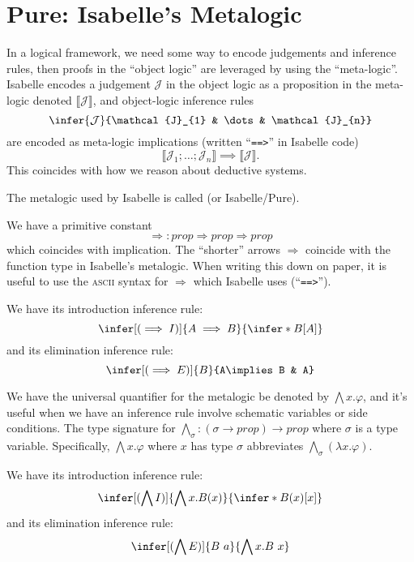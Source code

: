 \section{Pure: Isabelle's Metalogic}
\begin{node}\label{isabelle:metalogic-0000}%
In a logical framework, we need some way to encode judgements and
inference rules, then proofs in the ``object logic'' are leveraged by
using the ``meta-logic''. Isabelle encodes a judgement $\mathcal{J}$ in
the object logic as a proposition in the meta-logic denoted
$\llbracket\mathcal{J}\rrbracket$, and object-logic inference rules
\[\infer{\mathcal{J}}{\mathcal{J}_{1} & \dots & \mathcal{J}_{n}}\]
are encoded as meta-logic implications (written ``\texttt{==>}'' in
Isabelle code)
\[\llbracket\mathcal{J}_{1}; \dots; \mathcal{J}_{n}\rrbracket\implies\llbracket\mathcal{J}\rrbracket.\]
This coincides with how we reason about deductive systems.
\end{node}
\begin{definition}
The metalogic used by Isabelle is called  (or Isabelle/Pure).
\end{definition}
\begin{node}[Implies]\label{isabelle:metalogic-0001}%
We have a primitive constant
\[\Longrightarrow\colon prop\Rightarrow prop\Rightarrow prop\]
which coincides with implication. The ``shorter'' arrows $\Rightarrow$
coincide with the function type in Isabelle's metalogic. When writing
this down on paper, it is useful to use the \textsc{ascii} syntax for
$\Longrightarrow$ which Isabelle uses (``\texttt{==>}'').
\begin{node}\label{isabelle:metalogic-0004}%
We have its introduction inference rule:
\[\infer[(\implies I)]{A\implies B}{\infer*{B}{[A]}}\]
and its elimination inference rule:
\[\infer[(\implies E)]{B}{A\implies B & A}\]
\end{node} %
\end{node}
\begin{node}\label{isabelle:metalogic-0002}%
We have the universal quantifier for the metalogic be denoted by
$\bigwedge x.\varphi$, and it's useful when we have an inference rule
involve schematic variables or side conditions. The type signature for
$\bigwedge_{\sigma}\mathbin{:}(\sigma\to prop)\to prop$ where $\sigma$
is a type variable. Specifically, $\bigwedge x.\varphi$ where $x$ has
type $\sigma$ abbreviates $\bigwedge_{\sigma}(\lambda x.\varphi)$.
\begin{node}\label{isabelle:metalogic-0005}%
We have its introduction inference rule:
\[\infer[(\bigwedge I)]{\bigwedge x. B(x)}{\infer*{B(x)}{[x]}}\]
and its elimination inference rule:
\[\infer[(\bigwedge E)]{B~a}{\bigwedge x.B~x}\]
\end{node}
\end{node}
